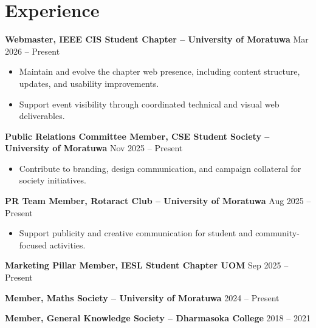 \documentclass[a4paper,11pt]{article}
\begin{document}
\section*{Experience}
\textbf{Webmaster, IEEE CIS Student Chapter -- University of Moratuwa} \hfill Mar 2026 -- Present
\begin{itemize}
    \item Maintain and evolve the chapter web presence, including content structure, updates, and usability improvements.
    \item Support event visibility through coordinated technical and visual web deliverables.
\end{itemize}

\textbf{Public Relations Committee Member, CSE Student Society -- University of Moratuwa} \hfill Nov 2025 -- Present
\begin{itemize}
    \item Contribute to branding, design communication, and campaign collateral for society initiatives.
\end{itemize}

\textbf{PR Team Member, Rotaract Club -- University of Moratuwa} \hfill Aug 2025 -- Present
\begin{itemize}
    \item Support publicity and creative communication for student and community-focused activities.
\end{itemize}

\textbf{Marketing Pillar Member, IESL Student Chapter UOM} \hfill Sep 2025 -- Present

\textbf{Member, Maths Society -- University of Moratuwa} \hfill 2024 -- Present

\textbf{Member, General Knowledge Society -- Dharmasoka College} \hfill 2018 -- 2021

\end{document}

